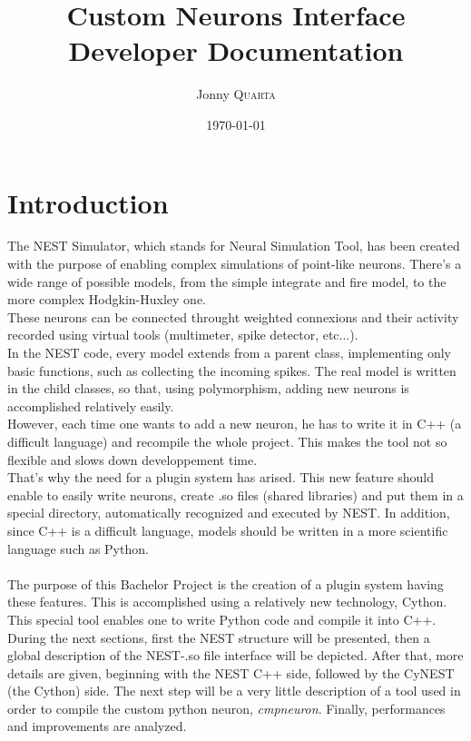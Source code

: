 \documentclass{article}
\title{Custom Neurons Interface\\Developer Documentation} %
\author{Jonny \textsc{Quarta}} %
\date{\today} %
\begin{document}
\maketitle %


\setlength\parindent{0pt} %

\renewcommand{\labelenumi}{\alph{enumi}.} %

\section{Introduction}
The NEST Simulator, which stands for Neural Simulation Tool, has been created with the purpose of enabling complex simulations of point-like neurons. There's a wide range of possible models, from the simple integrate and fire model, to the more complex Hodgkin-Huxley one.\\
These neurons can be connected throught weighted connexions and their activity recorded using virtual tools (multimeter, spike detector, etc...).\\

In the NEST code, every model extends from a parent class, implementing only basic functions, such as collecting the incoming spikes. The real model is written in the child classes, so that, using polymorphism, adding new neurons is accomplished relatively easily.\\
However, each time one wants to add a new neuron, he has to write it in C++ (a difficult language) and recompile the whole project. This makes the tool not so flexible and slows down developpement time.\\
That's why the need for a plugin system has arised. This new feature should enable to easily write neurons, create .so files (shared libraries) and put them in a special directory, automatically recognized and executed by NEST. In addition, since C++ is a difficult language, models should be written in a more scientific language such as Python.\\ \\
The purpose of this Bachelor Project is the creation of a plugin system having these features. This is accomplished using a relatively new technology, Cython. This special tool enables one to write Python code and compile it into C++.\\
During the next sections, first the NEST structure will be presented, then a global description of the NEST-.so file interface will be depicted. After that, more details are given, beginning with the NEST C++ side, followed by the CyNEST (the Cython) side. The next step will be a very little description of a tool used in order to compile the custom python neuron, \emph{cmpneuron}. Finally, performances and improvements are analyzed.
\end{document}
